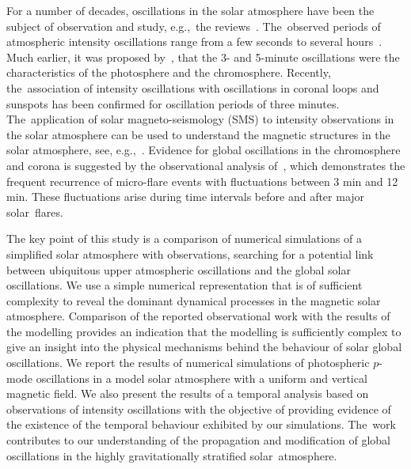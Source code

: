 \documentclass[physics,article,accept,pdftex,moreauthors]{Definitions/mdpi}
\begin{document}
 For a number of decades, oscillations in the solar atmosphere have been the subject of observation and study, e.g.,~the reviews~\cite{Banerjee2011,deMoortel2009,Mathioudakis2013,Ruderman2009,Wang2011}. The~observed periods of atmospheric intensity oscillations range from  a few seconds to several hours~\cite{Auchere2014}. Much earlier, it was proposed by~\cite{Jensen1963}, that the 3- and 5-minute oscillations were the characteristics of the photosphere and the chromosphere. Recently, the~association of intensity oscillations with oscillations in coronal loops and sunspots has been confirmed for oscillation periods of three minutes. The~application of solar magneto-seismology (SMS) to intensity observations in the solar atmosphere can be used to understand the magnetic structures in the solar atmosphere, see, e.g.,~\cite{Roberts1984,Banerjee2007,Zaqarashvili2007,Erdelyi2008,Verth2010}.  Evidence for global oscillations  in the chromosphere and corona is suggested by the observational analysis of~\cite{Gyenge2018},  which demonstrates the frequent recurrence of micro-flare events with fluctuations between 3 min and 12 min. These fluctuations arise during time intervals before and after major solar~flares.


The key point of this %
 {study}  
is a comparison of numerical simulations  of a simplified solar atmosphere with observations, searching for a  potential link between ubiquitous upper atmospheric oscillations and the global solar oscillations. We use a  simple numerical representation that is of sufficient complexity to reveal the dominant dynamical processes in the magnetic solar atmosphere. Comparison of the reported observational work with the results of the modelling provides an indication that the modelling is sufficiently complex to give an insight into the physical mechanisms behind the behaviour of solar global oscillations. We report the results of numerical simulations of photospheric $p$-mode oscillations in a model solar atmosphere with a uniform and vertical magnetic field. We also present the results of a temporal analysis based on observations of intensity oscillations with the objective of providing evidence of the existence of the temporal behaviour exhibited by our simulations. The~work contributes to our understanding of the propagation and modification of global oscillations in the highly gravitationally stratified solar~atmosphere. 




\end{document}
